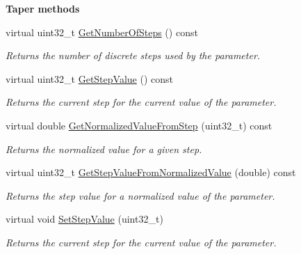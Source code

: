 \begin{Indent}{\bf Taper methods}
\begin{DoxyCompactItemize}
virtual uint32\+\_\+t \hyperlink{a00040_a4fb960531467eee4a9181bd4935da7df}{Get\+Number\+Of\+Steps} () const 
\begin{DoxyCompactList}\small\item\em Returns the number of discrete steps used by the parameter. \end{DoxyCompactList}\item 
virtual uint32\+\_\+t \hyperlink{a00040_a138fe318dd5fefb287d74692cefd24cc}{Get\+Step\+Value} () const 
\begin{DoxyCompactList}\small\item\em Returns the current step for the current value of the parameter. \end{DoxyCompactList}\item 
virtual double \hyperlink{a00040_a9e74126da23df05c7c482b8566fc9982}{Get\+Normalized\+Value\+From\+Step} (uint32\+\_\+t) const 
\begin{DoxyCompactList}\small\item\em Returns the normalized value for a given step. \end{DoxyCompactList}\item 
virtual uint32\+\_\+t \hyperlink{a00040_adb17ece40706c45d7a5b82db540f5cea}{Get\+Step\+Value\+From\+Normalized\+Value} (double) const 
\begin{DoxyCompactList}\small\item\em Returns the step value for a normalized value of the parameter. \end{DoxyCompactList}\item 
virtual void \hyperlink{a00040_a03b0ce99f1a82ff9a6871c91e2720eff}{Set\+Step\+Value} (uint32\+\_\+t)
\begin{DoxyCompactList}\small\item\em Returns the current step for the current value of the parameter. \end{DoxyCompactList}\end{DoxyCompactItemize}
\end{Indent}
